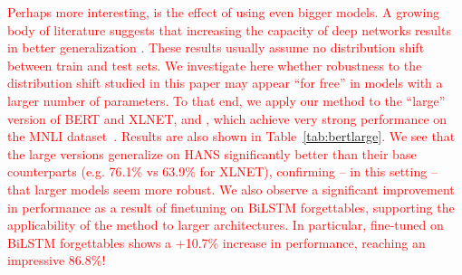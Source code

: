 \textcolor{red}{Perhaps more interesting, is the effect of using even bigger models. A growing body of literature suggests that increasing the capacity of deep networks results in better generalization \cite{belkin2018reconciling,deepdouble}. These results usually assume no distribution shift between train and test sets. We investigate here whether robustness to the distribution shift studied in this paper may appear ``for free'' in models with a larger number of parameters. To that end, we apply our method to the ``large'' version of BERT and XLNET, \bertlarge and \xlnetlarge, which 
achieve very strong performance on the MNLI dataset~\cite{devlin2018bert,yang2019xlnet}. Results are also shown in Table~\ref{tab:bertlarge}. We see that the large versions generalize on HANS significantly better than their base counterparts (e.g. 76.1\% vs 63.9\% for XLNET), confirming -- in this setting -- that larger models seem more robust. We also observe a significant improvement in performance as a result of finetuning on BiLSTM forgettables, supporting the applicability of the method to larger architectures. In particular, \xlnetlarge fine-tuned on BiLSTM forgettables shows a +10.7\% increase in performance, reaching an impressive 86.8\%!}

